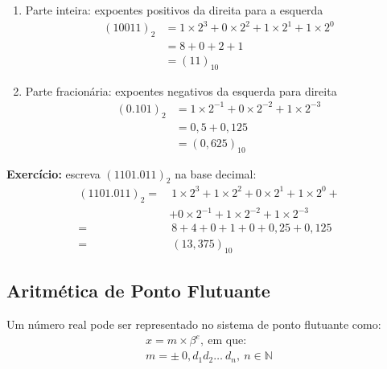 \documentclass{article}
\begin{document}
            \begin{enumerate}
                    \item Parte inteira: expoentes positivos da direita para a esquerda
                        \begin{align*}
                            {(10011)}_2 &= 1\times2^3 + 0\times2^2 + 1\times2^1 + 1\times2^0\\
                            &= 8 + 0 + 2 + 1\\
                            &= {(11)}_{10}
                        \end{align*}

                    \item Parte fracionária: expoentes negativos da esquerda para direita
                        \begin{align*}
                            {(0.101)}_2 &= 1\times2^{-1} + 0\times2^{-2} + 1\times2^{-3}\\
                            &= 0,5 + 0,125\\
                            &= {(0,625)}_{10}
                        \end{align*}
            \end{enumerate}

            \textbf{Exercício:} escreva ${(1101.011)}_2$ na base decimal:
            \begin{align*}
                {(1101.011)}_2 =&~1\times2^3 + 1\times2^2 + 0\times2^1 + 1\times2^0 +\\
                &+ 0\times2^{-1} + 1\times2^{-2} + 1\times2^{-3}\\
                =&~8 + 4 + 0 + 1 + 0 + 0,25 + 0,125\\
                =&~{(13,375)}_{10}
            \end{align*}

    \subsection{Aritmética de Ponto Flutuante}

        Um número real pode ser representado no sistema de ponto flutuante como:
        \begin{gather*}
            x = m\times\beta^e,~\textrm{em que:}\\
            m = \pm~0,d_1d_2\ldots~d_n,~n \in \mathbb{N}
        \end{gather*}
\end{document}
